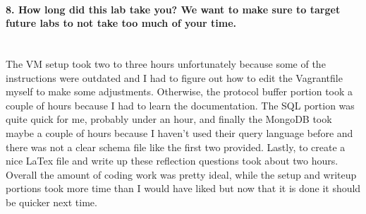 \documentclass[12pt]{article}
\begin{document}
\paragraph{8. How long did this lab take you? We want to make sure to target future labs to not take too much of your time.}\mbox{}\\

The VM setup took two to three hours unfortunately because some of the instructions were outdated and I had to figure out how to edit the Vagrantfile myself to make some adjustments. Otherwise, the protocol buffer portion took a couple of hours because I had to learn the documentation.  The SQL portion was quite quick for me, probably under an hour, and finally the MongoDB took maybe a couple of hours because I haven't used their query language before and there was not a clear schema file like the first two provided. Lastly, to create a nice LaTex file and write up these reflection questions took about two hours. Overall the amount of coding work was pretty ideal, while the setup and writeup portions took more time than I would have liked but now that it is done it should be quicker next time.
\end{document}
